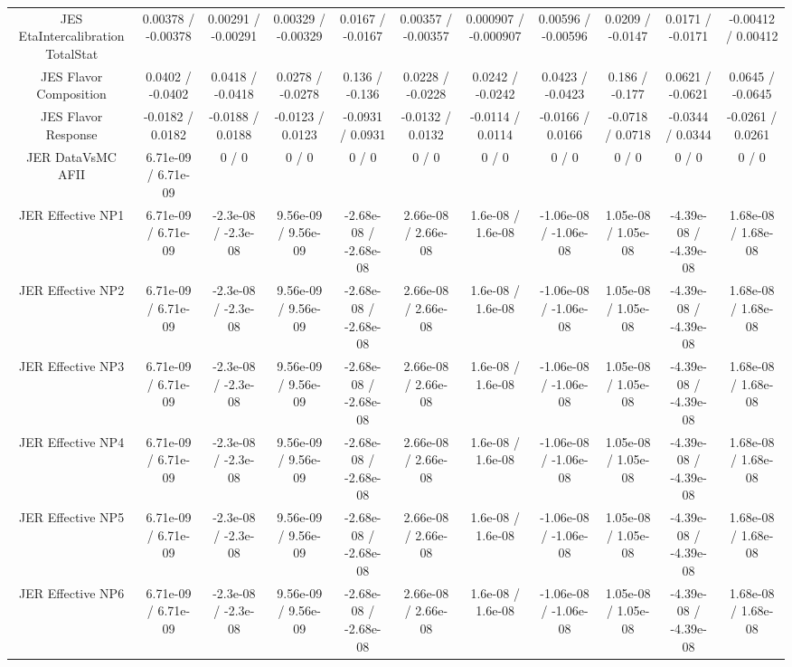 \begin{table}[htbp]
\begin{center}
\begin{tabular}{|c|c|c|c|c|c|c|c|c|c|c|}
  JES EtaIntercalibration TotalStat & 0.00378 / -0.00378 & 0.00291 / -0.00291 & 0.00329 / -0.00329 & 0.0167 / -0.0167 & 0.00357 / -0.00357 & 0.000907 / -0.000907 & 0.00596 / -0.00596 & 0.0209 / -0.0147 & 0.0171 / -0.0171 & -0.00412 / 0.00412 \\ 
  JES Flavor Composition & 0.0402 / -0.0402 & 0.0418 / -0.0418 & 0.0278 / -0.0278 & 0.136 / -0.136 & 0.0228 / -0.0228 & 0.0242 / -0.0242 & 0.0423 / -0.0423 & 0.186 / -0.177 & 0.0621 / -0.0621 & 0.0645 / -0.0645 \\ 
  JES Flavor Response & -0.0182 / 0.0182 & -0.0188 / 0.0188 & -0.0123 / 0.0123 & -0.0931 / 0.0931 & -0.0132 / 0.0132 & -0.0114 / 0.0114 & -0.0166 / 0.0166 & -0.0718 / 0.0718 & -0.0344 / 0.0344 & -0.0261 / 0.0261 \\ 
  JER DataVsMC AFII & 6.71e-09 / 6.71e-09 & 0 / 0 & 0 / 0 & 0 / 0 & 0 / 0 & 0 / 0 & 0 / 0 & 0 / 0 & 0 / 0 & 0 / 0 \\ 
  JER Effective NP1 & 6.71e-09 / 6.71e-09 & -2.3e-08 / -2.3e-08 & 9.56e-09 / 9.56e-09 & -2.68e-08 / -2.68e-08 & 2.66e-08 / 2.66e-08 & 1.6e-08 / 1.6e-08 & -1.06e-08 / -1.06e-08 & 1.05e-08 / 1.05e-08 & -4.39e-08 / -4.39e-08 & 1.68e-08 / 1.68e-08 \\ 
  JER Effective NP2 & 6.71e-09 / 6.71e-09 & -2.3e-08 / -2.3e-08 & 9.56e-09 / 9.56e-09 & -2.68e-08 / -2.68e-08 & 2.66e-08 / 2.66e-08 & 1.6e-08 / 1.6e-08 & -1.06e-08 / -1.06e-08 & 1.05e-08 / 1.05e-08 & -4.39e-08 / -4.39e-08 & 1.68e-08 / 1.68e-08 \\ 
  JER Effective NP3 & 6.71e-09 / 6.71e-09 & -2.3e-08 / -2.3e-08 & 9.56e-09 / 9.56e-09 & -2.68e-08 / -2.68e-08 & 2.66e-08 / 2.66e-08 & 1.6e-08 / 1.6e-08 & -1.06e-08 / -1.06e-08 & 1.05e-08 / 1.05e-08 & -4.39e-08 / -4.39e-08 & 1.68e-08 / 1.68e-08 \\ 
  JER Effective NP4 & 6.71e-09 / 6.71e-09 & -2.3e-08 / -2.3e-08 & 9.56e-09 / 9.56e-09 & -2.68e-08 / -2.68e-08 & 2.66e-08 / 2.66e-08 & 1.6e-08 / 1.6e-08 & -1.06e-08 / -1.06e-08 & 1.05e-08 / 1.05e-08 & -4.39e-08 / -4.39e-08 & 1.68e-08 / 1.68e-08 \\ 
  JER Effective NP5 & 6.71e-09 / 6.71e-09 & -2.3e-08 / -2.3e-08 & 9.56e-09 / 9.56e-09 & -2.68e-08 / -2.68e-08 & 2.66e-08 / 2.66e-08 & 1.6e-08 / 1.6e-08 & -1.06e-08 / -1.06e-08 & 1.05e-08 / 1.05e-08 & -4.39e-08 / -4.39e-08 & 1.68e-08 / 1.68e-08 \\ 
  JER Effective NP6 & 6.71e-09 / 6.71e-09 & -2.3e-08 / -2.3e-08 & 9.56e-09 / 9.56e-09 & -2.68e-08 / -2.68e-08 & 2.66e-08 / 2.66e-08 & 1.6e-08 / 1.6e-08 & -1.06e-08 / -1.06e-08 & 1.05e-08 / 1.05e-08 & -4.39e-08 / -4.39e-08 & 1.68e-08 / 1.68e-08 \\ 

\end{tabular}
\end{center}
\end{table}
